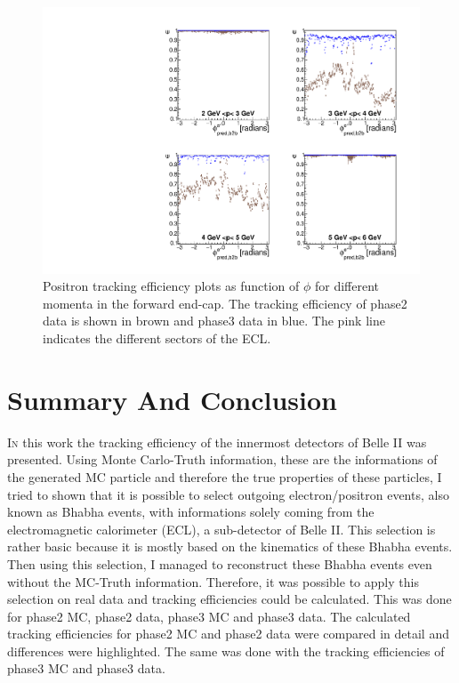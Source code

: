\documentclass[a4paper,11pt,twosided,final,german,openbib,pdftex,listof=totoc,bibliography=totoc]{scrbook}
\begin{document}
\begin{figure}[!htbp]
	\centering
	\includegraphics[width=\textwidth]{Plots/comp/cMPhiepEC_Data.pdf}
	\caption[Momentum $\phi$ Positron Efficiency Backward End-Cap Phase2 And Phase3 Data]{Positron tracking efficiency plots as function of $\phi$ for different momenta in the forward end-cap. The tracking efficiency of phase2 data is shown in brown and phase3 data in blue. The pink line indicates the different sectors of the ECL.}
	\label{plt:compPhiemEC}
\end{figure}


\chapter{Summary And Conclusion}
\label{cha:Conclusion}

\lettrine{I}{n} this work the tracking efficiency of the innermost detectors of Belle II was presented. 
Using Monte Carlo-Truth information, these are the informations of the generated MC particle and therefore the true properties of these particles, I tried to shown that it is possible to select outgoing electron/positron events, also known as Bhabha events, with informations solely coming from the electromagnetic calorimeter (ECL), a sub-detector of Belle II. 
This selection is rather basic because it is mostly based on the kinematics of these Bhabha events. Then using this selection, I managed to reconstruct these Bhabha events even without the MC-Truth information. Therefore, it was possible to apply this selection on real data and tracking efficiencies could be calculated. 
This was done for phase2 MC, phase2 data, phase3 MC and phase3 data.
The calculated tracking efficiencies for phase2 MC and phase2 data were compared in detail and differences were highlighted. The same was done with the tracking efficiencies of phase3 MC and phase3 data. 
\newline 
\end{document}
